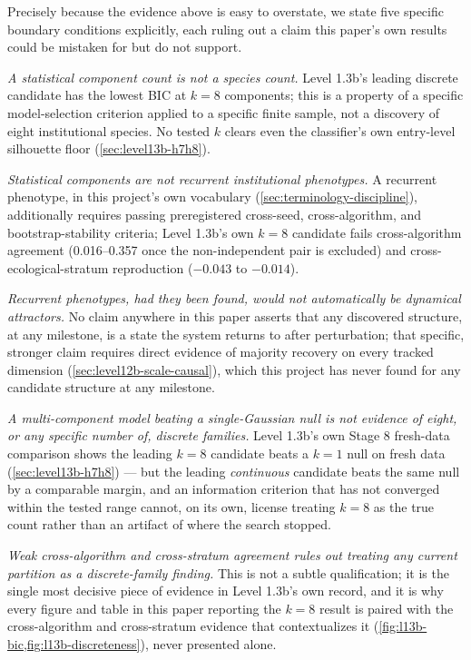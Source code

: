 Precisely because the evidence above is easy to overstate, we state five
specific boundary conditions explicitly, each ruling out a claim this
paper's own results could be mistaken for but do not support.

\textit{A statistical component count is not a species count.} Level
1.3b's leading discrete candidate has the lowest BIC at $k{=}8$ components;
this is a property of a specific model-selection criterion applied to a
specific finite sample, not a discovery of eight institutional species.
No tested $k$ clears even the classifier's own entry-level silhouette
floor (\cref{sec:level13b-h7h8}).

\textit{Statistical components are not recurrent institutional phenotypes.}
A recurrent phenotype, in this project's own vocabulary
(\cref{sec:terminology-discipline}), additionally requires passing
preregistered cross-seed, cross-algorithm, and bootstrap-stability
criteria; Level 1.3b's own $k{=}8$ candidate fails cross-algorithm
agreement (0.016--0.357 once the non-independent pair is excluded) and
cross-ecological-stratum reproduction ($-0.043$ to $-0.014$).

\textit{Recurrent phenotypes, had they been found, would not automatically
be dynamical attractors.} No claim anywhere in this paper asserts that any
discovered structure, at any milestone, is a state the system returns to
after perturbation; that specific, stronger claim requires direct evidence
of majority recovery on every tracked dimension
(\cref{sec:level12b-scale-causal}), which this project has never found for
any candidate structure at any milestone.

\textit{A multi-component model beating a single-Gaussian null is not
evidence of eight, or any specific number of, discrete families.} Level
1.3b's own Stage 8 fresh-data comparison shows the leading $k{=}8$
candidate beats a $k{=}1$ null on fresh data (\cref{sec:level13b-h7h8}) ---
but the leading \textit{continuous} candidate beats the same null by a
comparable margin, and an information criterion that has not converged
within the tested range cannot, on its own, license treating $k{=}8$ as
the true count rather than an artifact of where the search stopped.

\textit{Weak cross-algorithm and cross-stratum agreement rules out
treating any current partition as a discrete-family finding.} This is not
a subtle qualification; it is the single most decisive piece of evidence
in Level 1.3b's own record, and it is why every figure and table in this
paper reporting the $k{=}8$ result is paired with the cross-algorithm and
cross-stratum evidence that contextualizes it
(\cref{fig:l13b-bic,fig:l13b-discreteness}), never presented alone.

